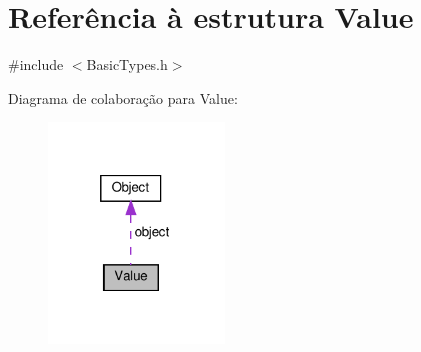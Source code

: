\hypertarget{structValue}{}\section{Referência à estrutura Value}
\label{structValue}


{\ttfamily \#include $<$Basic\+Types.\+h$>$}



Diagrama de colaboração para Value\+:
\nopagebreak
\begin{figure}[H]
\begin{center}
\leavevmode
\includegraphics[width=133pt]{structValue__coll__graph}
\end{center}
\end{figure}
